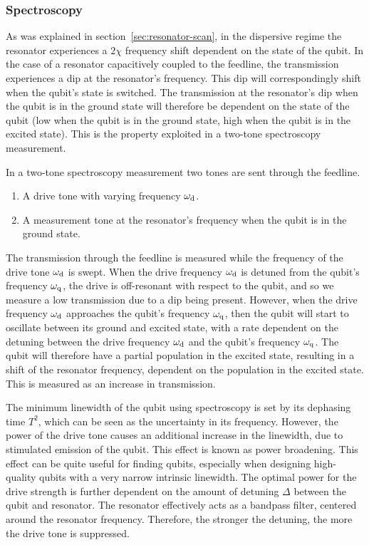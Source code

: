         \subsubsection{Spectroscopy}
          As was explained in section~\ref{sec:resonator-scan}, in the dispersive regime the resonator experiences a $2 \chi$ frequency shift dependent on the state of the qubit. In the case of a resonator capacitively coupled to the feedline, the transmission experiences a dip at the resonator's frequency. This dip will correspondingly shift when the qubit's state is switched. The transmission at the resonator's dip when the qubit is in the ground state will therefore be dependent on the state of the qubit (low when the qubit is in the ground state, high when the qubit is in the excited state). This is the property exploited in a two-tone spectroscopy measurement.

          In a two-tone spectroscopy measurement two tones are sent through the feedline.
          \begin{enumerate}
            \item A drive tone with varying frequency $\omega_\text{d}$.
            \item A measurement tone at the resonator's frequency when the qubit is in the ground state.
          \end{enumerate}

          The transmission through the feedline is measured while the frequency of the drive tone $\omega_\text{d}$ is swept. When the drive frequency $\omega_\text{d}$ is detuned from the qubit's frequency $\omega_\text{q}$, the drive is off-resonant with respect to the qubit, and so we measure a low transmission due to a dip being present. However, when the drive frequency $\omega_\text{d}$ approaches the qubit's frequency $\omega_\text{q}$, then the qubit will start to oscillate between its ground and excited state, with a rate dependent on the detuning between the drive frequency $\omega_\text{d}$ and the qubit's frequency $\omega_\text{q}$. The qubit will therefore have a partial population in the excited state, resulting in a shift of the resonator frequency, dependent on the population in the excited state. This is measured as an increase in transmission.

          The minimum linewidth of the qubit using spectroscopy is set by its dephasing time $T^2$, which can be seen as the uncertainty in its frequency. However, the power of the drive tone causes an additional increase in the linewidth, due to stimulated emission of the qubit. This effect is known as power broadening. This effect can be quite useful for finding qubits, especially when designing high-quality qubits with a very narrow intrinsic linewidth. The optimal power for the drive strength is further dependent on the amount of detuning $\Delta$ between the qubit and resonator. The resonator effectively acts as a bandpass filter, centered around the resonator frequency. Therefore, the stronger the detuning, the more the drive tone is suppressed.

